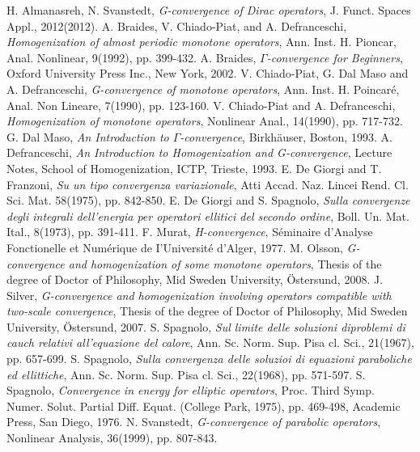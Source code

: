 \documentclass[11pt, epsf]{amsart}
\begin{document}
\begin{thebibliography}{References}\setlength{\itemsep}{2mm}
 H. Almanasreh, N. Svanstedt, \emph{G-convergence of Dirac operators}, J. Funct. Spaces Appl., 2012(2012).
 A. Braides, V. Chiado-Piat, and A. Defranceschi, \emph{Homogenization of almost periodic monotone operators}, Ann. Inst. H. Pioncar, Anal. Nonlinear, 9(1992), pp. 399-432.
 A. Braides, \emph{$\Gamma$-convergence for Beginners}, Oxford University Press Inc., New York, 2002.
 V. Chiado-Piat, G. Dal Maso and A. Defranceschi, \emph{G-convergence of monotone operators}, Ann. Inst. H. Poincar\'e, Anal. Non Lineare, 7(1990), pp. 123-160.
 V. Chiado-Piat and A. Defranceschi, \emph{Homogenization of monotone
operators}, Nonlinear Anal., 14(1990), pp. 717-732.
 G. Dal Maso, \emph{An Introduction to $\Gamma$-convergence},
Birkh\"{a}user, Boston, 1993.
 A. Defranceschi, \emph{An Introduction to Homogenization and G-convergence}, Lecture Notes, School of Homogenization, ICTP, Trieste, 1993.
 E. De Giorgi and T. Franzoni, \emph{Su un tipo convergenza variazionale}, Atti Accad. Naz. Lincei Rend. Cl. Sci. Mat. 58(1975), pp. 842-850.
 E. De Giorgi and S. Spagnolo, \emph{Sulla convergenze degli integrali dell'energia per operatori ellitici del secondo ordine}, Boll. Un. Mat. Ital., 8(1973), pp. 391-411.
 F. Murat, \emph{H-convergence}, S\'{e}minaire d'Analyse Fonctionelle et Num\'{e}rique de I'Universit\'{e} d'Alger, 1977.
 M. Olsson, \emph{G-convergence and homogenization of some monotone operators}, Thesis of the degree of Doctor of Philosophy, Mid Sweden University, \"{O}stersund, 2008.
 J. Silver, \emph{G-convergence and homogenization involving operators compatible with two-scale convergence}, Thesis of the degree of Doctor of Philosophy, Mid Sweden University, \"{O}stersund, 2007.
 S. Spagnolo, \emph{Sul limite delle soluzioni diproblemi di cauch relativi all'equazione del calore}, Ann. Sc. Norm. Sup. Pisa cl. Sci., 21(1967), pp. 657-699.
 S. Spagnolo, \emph{Sulla convergenza delle soluzioi di equazioni paraboliche ed ellittiche}, Ann. Sc. Norm. Sup. Pisa cl. Sci., 22(1968), pp. 571-597.
 S. Spagnolo, \emph{Convergence in energy for elliptic operators}, Proc. Third Symp. Numer. Solut. Partial Diff. Equat. (College Park, 1975), pp. 469-498, Academic Press, San Diego, 1976.
 N. Svanstedt, \emph{G-convergence of parabolic operators}, Nonlinear Analysis, 36(1999), pp. 807-843.

\end{thebibliography}
\end{document}
